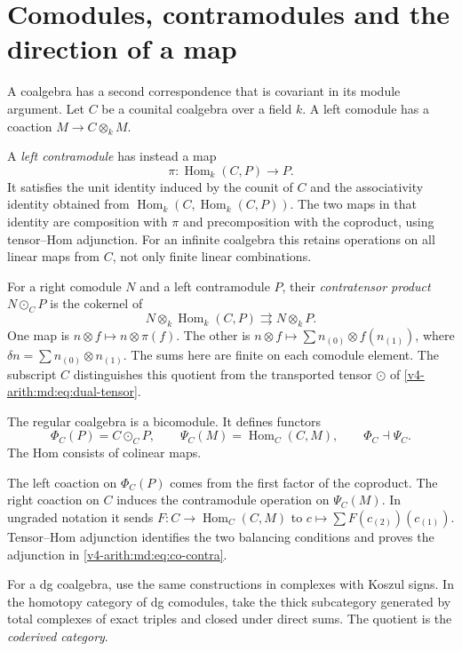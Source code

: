 \section{Comodules, contramodules and the direction of a map}
\label{v4-arith:md:sec:co-contra}

A coalgebra has a second correspondence that is covariant in its
module argument. Let $C$ be a counital coalgebra over a field $k$.
A left comodule has a coaction $M\to C\otimes_kM$.

A \emph{left contramodule} has instead a map
\[
 \pi:\operatorname{Hom}_k(C,P)\longrightarrow P.
\]
It satisfies the unit identity induced by the counit of $C$ and
the associativity identity obtained from
$\operatorname{Hom}_k(C,\operatorname{Hom}_k(C,P))$.
The two maps in that identity are composition with $\pi$ and
precomposition with the coproduct, using tensor--Hom adjunction.
For an infinite coalgebra this retains operations on all linear
maps from $C$, not only finite linear combinations.

For a right comodule $N$ and a left contramodule $P$, their
\emph{contratensor product} $N\odot_C P$ is the cokernel of
\[
 N\otimes_k\operatorname{Hom}_k(C,P)
 \rightrightarrows N\otimes_kP.
\]
One map is $n\otimes f\mapsto n\otimes\pi(f)$.
The other is $n\otimes f\mapsto\sum n_{(0)}\otimes f(n_{(1)})$,
where $\delta n=\sum n_{(0)}\otimes n_{(1)}$.
The sums here are finite on each comodule element. The subscript
$C$ distinguishes this quotient from the transported tensor
$\odot$ of \eqref{v4-arith:md:eq:dual-tensor}.

The regular coalgebra is a bicomodule. It defines functors
\begin{equation}\label{v4-arith:md:eq:co-contra}
 \Phi_C(P)=C\odot_C P,
 \qquad \Psi_C(M)=\operatorname{Hom}_C(C,M),
 \qquad \Phi_C\dashv\Psi_C.
\end{equation}
The Hom consists of colinear maps.

The left coaction on
$\Phi_C(P)$ comes from the first factor of the coproduct.
The right coaction on $C$ induces the contramodule operation
on $\Psi_C(M)$. In ungraded notation it sends
$F:C\to\operatorname{Hom}_C(C,M)$ to
$c\mapsto\sum F(c_{(2)})(c_{(1)})$.
Tensor--Hom adjunction identifies the two balancing conditions
and proves the adjunction in \eqref{v4-arith:md:eq:co-contra}.

For a dg coalgebra, use the same constructions in complexes with
Koszul signs. In the homotopy category of dg comodules, take the
thick subcategory generated by total complexes of exact triples
and closed under direct sums. The quotient is the
\emph{coderived category}.

